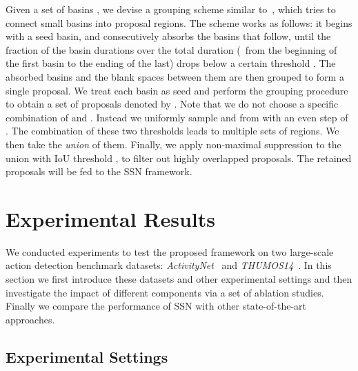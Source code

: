 \documentclass[10pt,twocolumn,letterpaper]{article}
\begin{document}
Given a set of basins , we devise a grouping scheme
similar to~\cite{PT2015MCG}, which tries to connect small basins into
proposal regions. The scheme works as follows: it begins with a
seed basin, and consecutively absorbs the basins that follow,
until the fraction of the basin durations over the total duration
(\ie~from the beginning of the first basin to the ending of the last)
drops below a certain threshold . The absorbed basins and the blank spaces between them are then grouped to form a single proposal. 
We treat each basin as seed and perform the grouping procedure to obtain a set of proposals denoted by .
Note that we do not choose a specific combination of  and .
Instead we uniformly sample  and  from   with an even step of .
The combination of these two thresholds leads to multiple sets of regions.
We then take the \emph{union} of them.
Finally, we apply non-maximal suppression to the union with IoU threshold ,
to filter out highly overlapped proposals. The retained proposals will be fed to
the SSN framework.

 


\section{Experimental Results}
\label{sec:experiment}

We conducted experiments to test the proposed framework
on two large-scale action detection benchmark datasets:
\emph{ActivityNet}~\cite{caba2015activitynet} and
\emph{THUMOS14}~\cite{Jiang2014THUMOS14}.
In this section we first introduce these datasets and other experimental settings and then investigate the impact of different components
via a set of ablation studies.
Finally we compare the performance of SSN with other state-of-the-art approaches.

\subsection{Experimental Settings}
\end{document}
